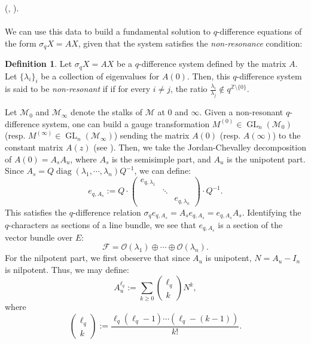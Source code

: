 \documentclass[a4paper]{report}
\theoremstyle{theorem}
\theoremstyle{definition}
\newtheorem{definition}{Definition}
\theoremstyle{remark}
\theoremstyle{proposition}
\theoremstyle{conjecture}
\theoremstyle{lemma}
\theoremstyle{corollary}
\theoremstyle{exercise}
\theoremstyle{example}
\newcommand{\mcal}{\mathcal}
\newcommand{\on}{\operatorname}
\begin{document}
  (\cite[Definition 2.5]{RW22}, \cite[\S 1.2.2]{sauloy03}).\\\\
  We can use this data to build a fundamental solution to $q$-difference 
  equations of the form $\sigma_qX = AX$, given that the system satisfies the 
  \emph{non-resonance} condition:
  \begin{definition}
      Let $\sigma_qX = AX$ be a $q$-difference system defined by the matrix 
      $A$. Let $\lbrace \lambda_i\rbrace_i$ be a collection of eigenvalues for 
      $A(0)$. Then, this $q$-difference system is said to be \emph{non-resonant}
      if if for every $i\neq j$, the ratio $\frac{\lambda_i}{\lambda_j} \not\in q^{\mathbb{Z}\setminus \lbrace0 \rbrace}$.
  \end{definition}
  
  Let $\mcal{M}_0$ and $\mcal{M}_\infty$ denote the stalks of $\mcal{M}$ at $0$ and $\infty$. 
  Given a non-resonant $q$-difference system, one can build a gauge transformation
  $M^{(0)} \in \on{GL}_n(\mcal{M}_0)$ (resp. $M^{(\infty)} \in \on{GL}_n(\mcal{M}_\infty)$) 
  sending the matrix $A(0)$ (resp. $A(\infty)$) to the constant matrix $A(z)$ (see \cite{sau16}). 
  Then, we take
  the Jordan-Chevalley decomposition of $A(0) = A_sA_u$, where $A_s$ is the 
  semisimple part, and $A_u$ is the unipotent part. Since 
  $A_s = Q\on{diag}(\lambda_1,\cdots,\lambda_n)Q^{-1}$, we can define:
  $$e_{q,A_s} := Q \cdot \begin{pmatrix}
      e_{q,\lambda_1} \\
      & \ddots\\
      & & e_{q,\lambda_n}
  \end{pmatrix} \cdot Q^{-1}.$$
  This satisfies the $q$-difference relation $\sigma_q e_{q,A_s} = A_s e_{q,A_s} = e_{q,A_s}A_s$.
  Identifying the $q$-characters as sections of a line bundle, we see that $e_{q,A_s}$ is a section of the 
  vector bundle over $E$: 
  $$\mcal{F} = \mcal{O}(\lambda_1) \oplus \cdots \oplus \mcal{O}(\lambda_n).$$
  For the nilpotent part, we first obeserve that since $A_u$ is unipotent,
  $N = A_u - I_n$ is nilpotent. Thus, we may define:
  $$A_u^{\ell_q} := \sum_{k\geq 0} \begin{pmatrix}
      \ell_q\\
      k
  \end{pmatrix} N^k,$$
  where $$\begin{pmatrix}
      \ell_q\\
      k 
  \end{pmatrix} := \frac{\ell_q(\ell_q-1)\cdots (\ell_q-(k-1))}{k!}.$$
\end{document}
